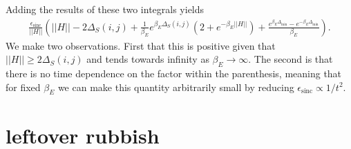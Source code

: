 \documentclass{article}
\newcommand{\parens}[1]{\left( #1 \right)}
\newcommand{\norm}[1]{\left| \left| #1 \right| \right|}
\DeclareMathOperator{\sinc}{sinc}
\begin{document}
Adding the results of these two integrals yields
\begin{align}
    \frac{\epsilon_{\sinc}}{\norm{H}}\parens{\norm{H} - 2 \Delta_S(i,j) +  \frac{1}{\beta_E} e^{\beta_E \Delta_S(i,j)}(2 + e^{-\beta_E \norm{H}}) + \frac{e^{\beta_E \Delta_{\min}} - e^{-\beta_E \Delta_{\min}}}{\beta_E}}.
\end{align}
We make two observations. First that this is positive given that $\norm{H} \geq 2 \Delta_S(i,j)$ and tends towards infinity as $\beta_E \to \infty$. The second is that there is no time dependence on the factor within the parenthesis, meaning that for fixed $\beta_E$ we can make this quantity arbitrarily small by reducing $\epsilon_{\sinc} \propto 1/t^2$. 


 \section{leftover rubbish}
\end{document}
